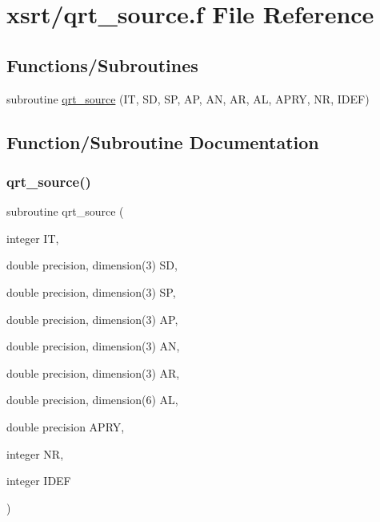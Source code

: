 \hypertarget{qrt__source_8f}{}\section{xsrt/qrt\+\_\+source.f File Reference}
\label{qrt__source_8f}
\subsection*{Functions/\+Subroutines}
\begin{DoxyCompactItemize}
\item 
subroutine \hyperlink{qrt__source_8f_ad69a593fa113e07d816baffecd9267c4}{qrt\+\_\+source} (IT, SD, SP, AP, AN, AR, AL, A\+P\+RY, NR, I\+D\+EF)
\end{DoxyCompactItemize}


\subsection{Function/\+Subroutine Documentation}
\mbox{\label{qrt__source_8f_ad69a593fa113e07d816baffecd9267c4}} 
\subsubsection{\texorpdfstring{qrt\+\_\+source()}{qrt\_source()}}
{\footnotesize\ttfamily subroutine qrt\+\_\+source (\begin{DoxyParamCaption}\item[{integer}]{IT,  }\item[{double precision, dimension(3)}]{SD,  }\item[{double precision, dimension(3)}]{SP,  }\item[{double precision, dimension(3)}]{AP,  }\item[{double precision, dimension(3)}]{AN,  }\item[{double precision, dimension(3)}]{AR,  }\item[{double precision, dimension(6)}]{AL,  }\item[{double precision}]{A\+P\+RY,  }\item[{integer}]{NR,  }\item[{integer}]{I\+D\+EF }\end{DoxyParamCaption})}

